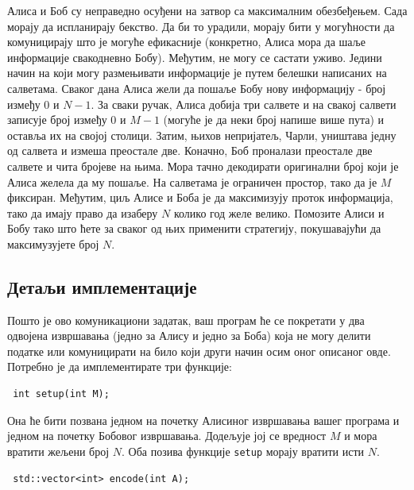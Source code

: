 \documentclass[12pt]{article}
\begin{document}
\renewcommand{\round}{Дан 1}
\renewcommand{\problemName}{Задатак Prison}
\renewcommand{\lang}{Српски}

\renewcommand{\tl}{$2$ секунде}
\renewcommand{\ml}{$1024$ MB}
\problem{\problemName}

Алиса и Боб су неправедно осуђени на затвор са максималним обезбеђењем. Сада морају да испланирају бекство. Да би то урадили, морају бити у могућности да комуницирају што је могуће ефикасније (конкретно, Алиса мора да шаље информације свакодневно Бобу). Међутим, не могу се састати уживо. Једини начин на који могу размењивати информације је путем белешки написаних на салветама. Сваког дана Алиса жели да пошаље Бобу нову информацију - број између $0$ и $N-1$. За сваки ручак, Алиса добија три салвете и на свакој салвети записује број између $0$ и $M-1$ (могуће је да неки број напише више пута) и оставља их на својој столици. Затим, њихов непријатељ, Чарли, уништава једну од салвета и измеша преостале две. Коначно, Боб проналази преостале две салвете и чита бројеве на њима. Мора тачно декодирати оригинални број који је Алиса желела да му пошаље. На салветама је ограничен простор, тако да је $M$ фиксиран. Међутим, циљ Алисе и Боба је да максимизују проток информација, тако да имају право да изаберу $N$ колико год желе велико. Помозите Алиси и Бобу тако што ћете за сваког од њих применити стратегију, покушавајући да максимузујете број $N$.

\subsection{Детаљи имплементације}
Пошто је ово комуникациони задатак, ваш програм ће се покретати у два одвојена извршавања (једно за Алису и једно за Боба) која не могу делити податке или комуницирати на било који други начин осим оног описаног овде. Потребно је да имплементирате три функције:

\begin{lstlisting}
 int setup(int M);
\end{lstlisting}

Она ће бити позвана једном на почетку Алисиног извршавања вашег програма и једном на почетку Бобовог извршавања. Додељује јој се вредност $M$ и мора вратити жељени број $N$. Оба позива функције \texttt{setup} морају вратити исти $N$.

\begin{lstlisting}
 std::vector<int> encode(int A);
\end{lstlisting}
\end{document}
